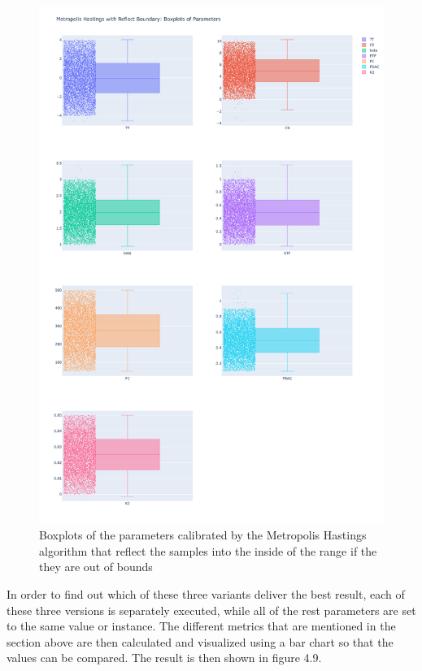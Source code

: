 \begin{figure}
    \centering
    \includegraphics[width=1\textwidth]{figures/basic_mh/rb_mh/rb_mh_boxplot.png}
    \captionsetup{width=.8\textwidth}
    \caption{Boxplots of the parameters calibrated by the Metropolis Hastings algorithm that reflect the samples into the inside of the range if the they are out of bounds}
    \label{fig:enter-label}
\end{figure}



In order to find out which of these three variants deliver the best result, each of these three versions is separately executed, while all of the rest parameters are set to the same value or instance. The different metrics that are mentioned in the section above are then calculated and visualized using a bar chart so that the values can be compared. The result is then shown in figure 4.9.


